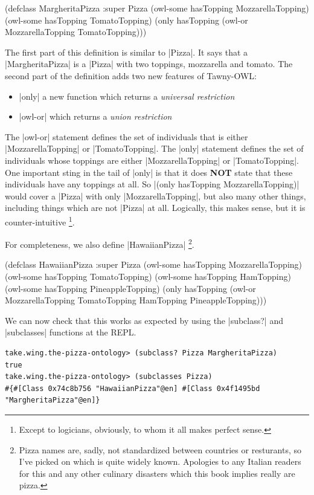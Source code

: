 \begin{tawny}
(defclass MargheritaPizza
  :super
  Pizza
  (owl-some hasTopping MozzarellaTopping)
  (owl-some hasTopping TomatoTopping)
  (only hasTopping (owl-or MozzarellaTopping TomatoTopping)))
\end{tawny}

The first part of this definition is similar to |Pizza|. It says that a
|MargheritaPizza| is a |Pizza| with two toppings, mozzarella and tomato. The
second part of the definition adds two new features of Tawny-OWL:

\begin{itemize}
\item |only| a new function which returns a \emph{universal restriction}
\item |owl-or| which returns a \emph{union restriction}
\end{itemize}

The |owl-or| statement defines the set of individuals that is either
|MozzarellaTopping| or |TomatoTopping|. The |only| statement
defines the set of individuals whose toppings are either
|MozzarellaTopping| or |TomatoTopping|. One important sting in the
tail of |only| is that it does \textbf{NOT} state that these individuals
have any toppings at all. So |(only hasTopping MozzarellaTopping)| would
cover a |Pizza| with only |MozzarellaTopping|, but also many other
things, including things which are not |Pizza| at all. Logically, this
makes sense, but it is counter-intuitive \footnote{Except to logicians,
  obviously, to whom it all makes perfect sense.}.

For completeness, we also define |HawaiianPizza| \footnote{Pizza names are, sadly,
not standardized between countries or resturants, so I've picked on which is
quite widely known. Apologies to any Italian readers for this and any other
culinary disasters which this book implies really are pizza.}.

\begin{tawny}
(defclass HawaiianPizza
  :super
  Pizza
  (owl-some hasTopping MozzarellaTopping)
  (owl-some hasTopping TomatoTopping)
  (owl-some hasTopping HamTopping)
  (owl-some hasTopping PineappleTopping)
  (only hasTopping
        (owl-or MozzarellaTopping TomatoTopping HamTopping PineappleTopping)))
\end{tawny}

We can now check that this works as expected by using the |subclass?| and
|subclasses| functions at the REPL.

\begin{verbatim}
take.wing.the-pizza-ontology> (subclass? Pizza MargheritaPizza)
true
take.wing.the-pizza-ontology> (subclasses Pizza)
#{#[Class 0x74c8b756 "HawaiianPizza"@en] #[Class 0x4f1495bd "MargheritaPizza"@en]}
\end{verbatim}

